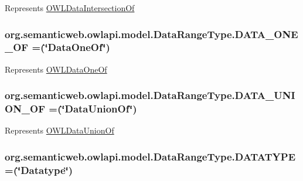 Represents \hyperlink{interfaceorg_1_1semanticweb_1_1owlapi_1_1model_1_1_o_w_l_data_intersection_of}{O\-W\-L\-Data\-Intersection\-Of} \hypertarget{enumorg_1_1semanticweb_1_1owlapi_1_1model_1_1_data_range_type_ac5969e0951ba9051a38fe79058edd9aa}{
\subsubsection[{D\-A\-T\-A\-\_\-\-O\-N\-E\-\_\-\-O\-F}]{\setlength{\rightskip}{0pt plus 5cm}org.\-semanticweb.\-owlapi.\-model.\-Data\-Range\-Type.\-D\-A\-T\-A\-\_\-\-O\-N\-E\-\_\-\-O\-F =(\char`\"{}Data\-One\-Of\char`\"{})}}\label{enumorg_1_1semanticweb_1_1owlapi_1_1model_1_1_data_range_type_ac5969e0951ba9051a38fe79058edd9aa}
Represents \hyperlink{interfaceorg_1_1semanticweb_1_1owlapi_1_1model_1_1_o_w_l_data_one_of}{O\-W\-L\-Data\-One\-Of} \hypertarget{enumorg_1_1semanticweb_1_1owlapi_1_1model_1_1_data_range_type_afa28387e0431b51af2963c0c4506d0f7}{
\subsubsection[{D\-A\-T\-A\-\_\-\-U\-N\-I\-O\-N\-\_\-\-O\-F}]{\setlength{\rightskip}{0pt plus 5cm}org.\-semanticweb.\-owlapi.\-model.\-Data\-Range\-Type.\-D\-A\-T\-A\-\_\-\-U\-N\-I\-O\-N\-\_\-\-O\-F =(\char`\"{}Data\-Union\-Of\char`\"{})}}\label{enumorg_1_1semanticweb_1_1owlapi_1_1model_1_1_data_range_type_afa28387e0431b51af2963c0c4506d0f7}
Represents \hyperlink{interfaceorg_1_1semanticweb_1_1owlapi_1_1model_1_1_o_w_l_data_union_of}{O\-W\-L\-Data\-Union\-Of} \hypertarget{enumorg_1_1semanticweb_1_1owlapi_1_1model_1_1_data_range_type_a850fc31c640c6beb9f46082527c189c3}{
\subsubsection[{D\-A\-T\-A\-T\-Y\-P\-E}]{\setlength{\rightskip}{0pt plus 5cm}org.\-semanticweb.\-owlapi.\-model.\-Data\-Range\-Type.\-D\-A\-T\-A\-T\-Y\-P\-E =(\char`\"{}Datatype\char`\"{})}}\label{enumorg_1_1semanticweb_1_1owlapi_1_1model_1_1_data_range_type_a850fc31c640c6beb9f46082527c189c3}
